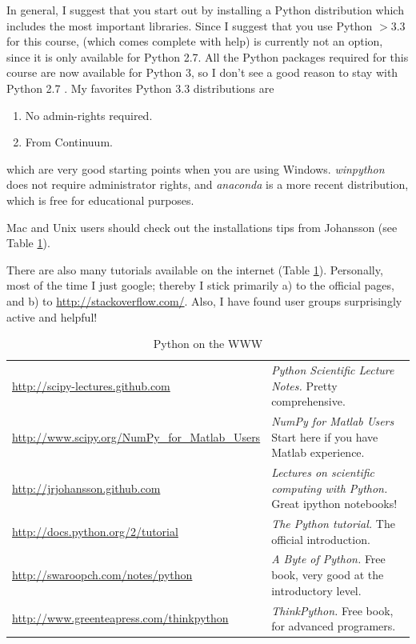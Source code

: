 In general, I suggest that you start out by installing a Python distribution which includes the most important libraries. Since I suggest that you use Python $>3.3$ for this course, \cite{pythonxy} (which comes complete with help) is currently not an option, since it is only available for Python 2.7. All the Python packages required for this course are now available for Python 3, so I don't see a good reason to stay with Python 2.7 . My favorites Python 3.3 distributions  are

\begin{enumerate}
    \item \cite{winpython} No admin-rights required.
    \item \cite{anaconda} From Continuum.
\end{enumerate}

which are very good starting points when you are using Windows. \emph{winpython} does not require administrator rights, and \emph{anaconda} is a more recent distribution, which is free for educational purposes.

Mac and Unix users should check out the installations tips from Johansson (see Table \ref{table:python}).

There are also many tutorials available on the internet (Table \ref{table:python}). Personally, most of the time I just google; thereby I stick primarily a) to the official pages, and b) to \url{http://stackoverflow.com/}. Also, I have found user groups surprisingly active and helpful!

\begin{table}

  \footnotesize{
  \centering
   \begin{tabular}{|l p{8 cm}|}
     \hline
     \url{http://scipy-lectures.github.com} & \emph{Python Scientific Lecture Notes.} Pretty comprehensive. \\     \url{http://www.scipy.org/NumPy\_for\_Matlab\_Users} & \emph{NumPy for Matlab Users} Start here if you have Matlab experience. \\
     \url {http://jrjohansson.github.com} & \emph{Lectures on scientific computing with Python.} Great ipython notebooks! \\     \url{http://docs.python.org/2/tutorial} & \emph{The Python tutorial.} The official introduction. \\
     \url{http://swaroopch.com/notes/python} & \emph{A Byte of Python.} Free book, very good at the introductory level. \\
     \url{http://www.greenteapress.com/thinkpython} & \emph{ThinkPython.} Free book, for advanced programers. \\

     \hline
   \end{tabular}
   }
  \caption{Python on the WWW}\label{table:python}
\end{table}

